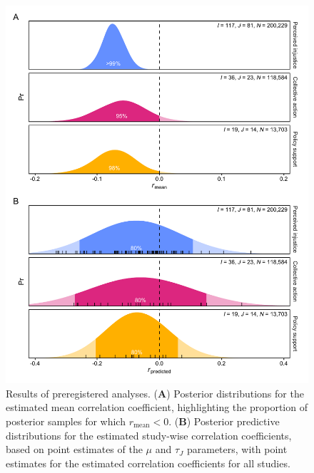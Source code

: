 \documentclass[
]{article}
\begin{document}
\begin{figure}

{\centering \includegraphics{../figures/figure-3} 

}

\caption{Results of preregistered analyses. (\textbf{A}) Posterior distributions for the estimated mean correlation coefficient, highlighting the proportion of posterior samples for which $r_\text{mean} < 0$. (\textbf{B}) Posterior predictive distributions for the estimated study-wise correlation coefficients, based on point estimates of the $\mu$ and $\tau_J$ parameters, with point estimates for the estimated correlation coefficients for all studies.}\label{fig:unnamed-chunk-3}
\end{figure}
\end{document}
